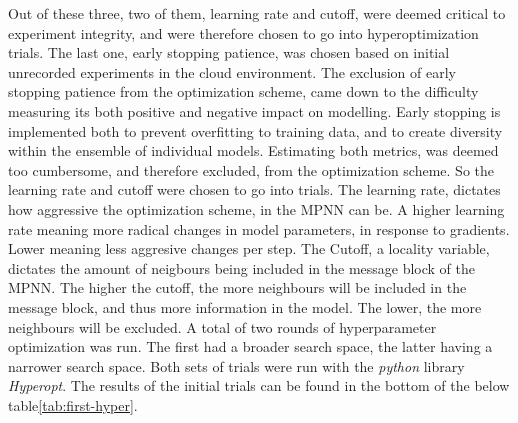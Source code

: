 Out of these three, two of them, learning rate and cutoff, were deemed critical to experiment integrity, and were therefore chosen
to go into hyperoptimization trials. The
last one, early stopping patience, was chosen based on initial unrecorded experiments in the cloud environment.
The exclusion of early stopping patience from the
optimization scheme, came down to the difficulty measuring its both positive and negative impact on modelling. Early stopping is implemented both to prevent
overfitting to training data, and to create diversity within the ensemble of individual models. Estimating both metrics, was deemed too cumbersome,
and therefore excluded, from the optimization scheme.
So the learning rate and cutoff were chosen to go into trials. The learning rate,
dictates how aggressive the optimization scheme, in the MPNN can be. A higher learning rate meaning more radical changes in model parameters,
in response to gradients. Lower meaning less aggresive changes per step. The Cutoff, a locality variable, dictates the amount of neigbours being included in the
message block of the MPNN. The higher the cutoff, the more neighbours will be included in the message block, and thus more information in the model.
The lower, the more neighbours will be excluded. A total of two rounds of hyperparameter optimization was run. The first had a broader search space,
the latter having a narrower search space. Both sets of trials were run with the \textit{python} library \textit{Hyperopt}\cite{hyperopt}.
The results of the initial trials can be found in the bottom of the below table\ref{tab:first-hyper}.

